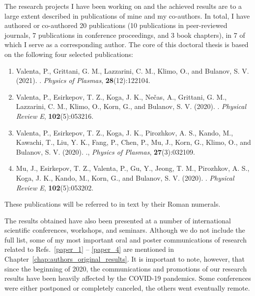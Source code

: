 \documentclass[10pt, a4paper, twoside, openright]{report}
\newcommand{\link}[3][blue]{\href{#2}{\color{#1}{#3}}}%
\begin{document}
The research projects I have been working on and the achieved results are to a large extent described in publications of mine and my co-authors. In total, I have authored or co-authored 20 publications (10 publications in peer-reviewed journals, 7 publications in conference proceedings, and 3 book chapters), in 7 of which I serve as a corresponding author. The core of this doctoral thesis is based on the following four selected publications:
\begin{enumerate}[label=\Roman*.]
	\item \label{paper_1} Valenta, P., Grittani, G. M., Lazzarini, C. M., Klimo, O., and Bulanov, S. V. (2021). \link{https://doi.org/10.1063/5.0065167}{On the electromagnetic-electron rings originating from the interaction of high-power short-pulse laser and underdense plasma}. \textit{Physics of Plasmas}, \textbf{28}(12):122104.
	
	\item \label{paper_2} Valenta, P., Esirkepov, T. Z., Koga, J. K., Nečas, A., Grittani, G. M., Lazzarini, C. M., Klimo, O., Korn, G., and Bulanov, S. V. (2020). \link{https://doi.org/10.1103/PhysRevE.102.053216}{Polarity reversal of wakefields driven by ultrashort pulse laser}. \textit{Physical Review E}, \textbf{102}(5):053216.
	
	\item \label{paper_3} Valenta, P., Esirkepov, T. Z., Koga, J. K., Pirozhkov, A. S., Kando, M., Kawachi, T., Liu, Y. K., Fang, P., Chen, P., Mu, J., Korn, G., Klimo, O., and Bulanov, S. V. (2020). \link{https://doi.org/10.1063/1.5142084}{Recoil effects on reflection from relativistic mirrors in laser plasmas}., \textit{Physics of Plasmas}, \textbf{27}(3):032109.
	
	\item \label{paper_4} Mu, J., Esirkepov, T. Z., Valenta, P., Gu, Y., Jeong, T. M., Pirozhkov, A. S., Koga, J. K., Kando, M., Korn, G., and Bulanov, S. V. (2020). \link{https://doi.org/10.1103/PhysRevE.102.053202}{Relativistic flying forcibly oscillating reflective diffraction grating}. \textit{Physical Review E}, \textbf{102}(5):053202.
	
\end{enumerate}
These publications will be referred to in text by their Roman numerals.

The results obtained have also been presented at a number of international scientific conferences, workshops, and seminars. Although we do not include the full list, some of my most important oral and poster communications of research related to Refs.~\ref{paper_1} -- \ref{paper_4} are mentioned in Chapter~\ref{chap:authors_original_results}. It is important to note, however, that since the beginning of 2020, the communications and promotions of our research results have been heavily affected by the COVID-19 pandemics. Some conferences were either postponed or completely canceled, the others went eventually remote.
\end{document}
